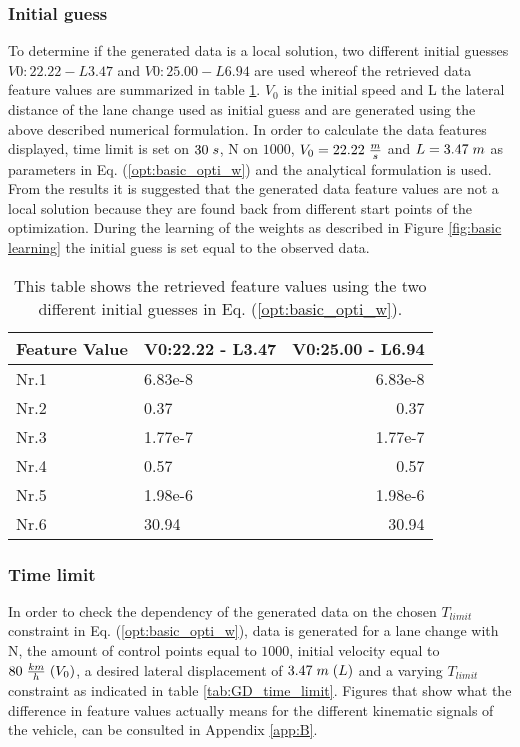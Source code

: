 \subsubsection{Initial guess}
To determine if the generated data is a local solution, two different initial guesses $V0:22.22 - L3.47$ and $V0:25.00 - L6.94$ are used whereof the retrieved data feature values are summarized in table \ref{tab:GD_local_test}. $V_0$ is the initial speed and L the lateral distance of the lane change used as initial guess and are generated using the above described numerical formulation. In order to calculate the data features displayed, time limit is set on $30\hspace{1mm}s$, N on $1000$, $V_{0} = 22.22\hspace{1mm}\frac{m}{s}$ and $L = 3.47\hspace{1mm}m$ as parameters in Eq. (\ref{opt:basic_opti_w}) and the analytical formulation is used. From the results it is suggested that the generated data feature values are not a local solution because they are found back from different start points of the optimization. During the learning of the weights as described in Figure \ref{fig:basic learning} the initial guess is set equal to the observed data. 

\begin{table}[h!]
	\centering
	\begin{tabular}{@{}llr@{}} \toprule
		\textbf{Feature Value}     & V0:22.22 - L3.47 & V0:25.00 - L6.94\\ \midrule
		Nr.1       & 6.83e-8   & 6.83e-8 \\
		Nr.2       & 0.37        & 0.37  \\
		Nr.3       & 1.77e-7     & 1.77e-7 \\
		Nr.4       & 0.57    & 0.57  \\
		Nr.5       & 1.98e-6     & 1.98e-6 \\
		Nr.6       & 30.94      & 30.94\\ \bottomrule
	\end{tabular}
	\caption{This table shows the retrieved feature values using the two different  initial guesses in Eq. (\ref{opt:basic_opti_w}).}
	\label{tab:GD_local_test}
\end{table}

\subsubsection{Time limit}
In order to check the dependency of the generated data on the chosen $T_{limit}$ constraint in Eq. (\ref{opt:basic_opti_w}), data is generated for a lane change with N, the amount of control points equal to $1000$, initial velocity equal to $80 \hspace{1 mm} \frac{km}{h}\hspace{1mm}(V_{0})$, a desired lateral displacement of $3.47\hspace{1mm}m\hspace{1mm}(L)$ and a varying $T_{limit}$ constraint as indicated in table \ref{tab:GD_time_limit}. Figures that  show what the difference in feature values actually means for the different kinematic signals of the vehicle, can be consulted in Appendix \ref{app:B}.

